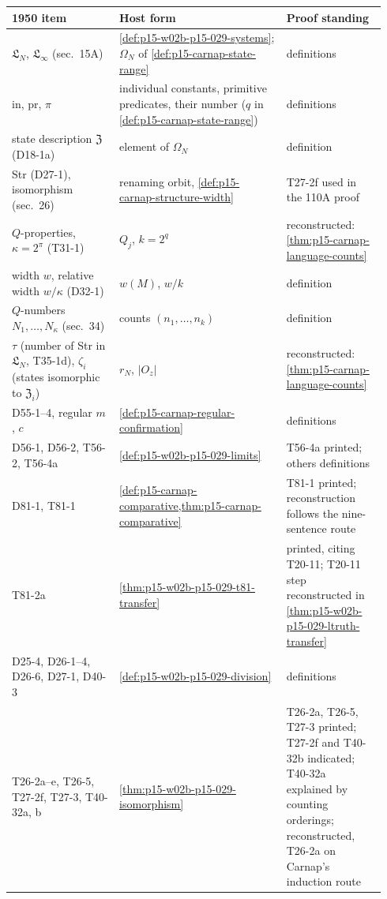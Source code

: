 \begin{center}
\small
\begin{tabular}{@{}p{0.27\linewidth}p{0.42\linewidth}p{0.25\linewidth}@{}}
\hline
1950 item & Host form & Proof standing\\
\hline
\(\mathfrak L_N\), \(\mathfrak L_\infty\) (sec.~15A) &
\cref{def:p15-w02b-p15-029-systems}; \(\Omega_N\) of
\cref{def:p15-carnap-state-range} & definitions\\
in, pr, \(\pi\) & individual constants, primitive predicates, their
number (\(q\) in \cref{def:p15-carnap-state-range}) & definitions\\
state description \(\mathfrak Z\) (D18-1a) & element of \(\Omega_N\) &
definition\\
Str (D27-1), isomorphism (sec.~26) & renaming orbit,
\cref{def:p15-carnap-structure-width} & T27-2f used in the 110A proof\\
\(Q\)-properties, \(\kappa=2^\pi\) (T31-1) & \(Q_j\), \(k=2^q\) &
reconstructed: \cref{thm:p15-carnap-language-counts}\\
width \(w\), relative width \(w/\kappa\) (D32-1) & \(w(M)\), \(w/k\)
& definition\\
\(Q\)-numbers \(N_1,\ldots,N_\kappa\) (sec.~34) & counts
\((n_1,\ldots,n_k)\) & definition\\
\(\tau\) (number of Str in \(\mathfrak L_N\), T35-1d), \(\zeta_i\)
(states isomorphic to \(\mathfrak Z_i\)) & \(r_N\), \(\lvert O_z\rvert\) & reconstructed:
\cref{thm:p15-carnap-language-counts}\\
D55-1--4, regular \(m\), \(c\) & \cref{def:p15-carnap-regular-confirmation}
& definitions\\
D56-1, D56-2, T56-2, T56-4a & \cref{def:p15-w02b-p15-029-limits} &
T56-4a printed; others definitions\\
D81-1, T81-1 & \cref{def:p15-carnap-comparative,thm:p15-carnap-comparative}
& T81-1 printed; reconstruction follows the nine-sentence route\\
T81-2a & \cref{thm:p15-w02b-p15-029-t81-transfer} & printed, citing
T20-11; T20-11 step reconstructed in
\cref{thm:p15-w02b-p15-029-ltruth-transfer}\\
D25-4, D26-1--4, D26-6, D27-1, D40-3 &
\cref{def:p15-w02b-p15-029-division} & definitions\\
T26-2a--e, T26-5, T27-2f, T27-3, T40-32a, b &
\cref{thm:p15-w02b-p15-029-isomorphism} & T26-2a, T26-5, T27-3
printed; T27-2f and T40-32b indicated; T40-32a explained by counting
orderings; reconstructed, T26-2a on Carnap's induction route\\

\end{tabular}
\end{center}
